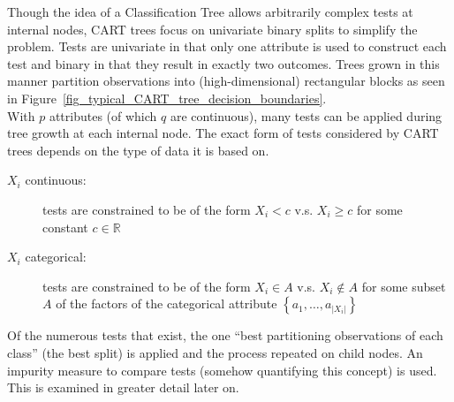 Though the idea of a Classification Tree allows arbitrarily complex tests at internal nodes, CART trees focus on univariate binary splits to simplify the problem. Tests are univariate in that only one attribute is used to construct each test and binary in that they result in exactly two outcomes. Trees grown in this manner partition observations into (high-dimensional) rectangular blocks as seen in Figure~\ref{fig_typical_CART_tree_decision_boundaries}.\\

With $p$ attributes (of which $q$ are continuous), many tests can be applied during tree growth at each internal node. The exact form of tests considered by CART trees depends on the type of data it is based on.
\begin{description}
\item[$X_i$ continuous:] tests are constrained to be of the form $X_i<c$ v.s. $X_i\geq c$ for some constant $c\in\mathbb{R}$
\item[$X_i$ categorical:] tests are constrained to be of the form $X_i\in A$ v.s. $X_i\notin A$ for some subset $A$ of the factors of the categorical attribute $\left\{a_1,\ldots,a_{|X_i|}\right\}$ 
\end{description}
Of the numerous tests that exist, the one ``best partitioning observations of each class'' (the best split) is applied and the process repeated on child nodes. An impurity measure to compare tests (somehow quantifying this concept) is used. This is examined in greater detail later on.\\

